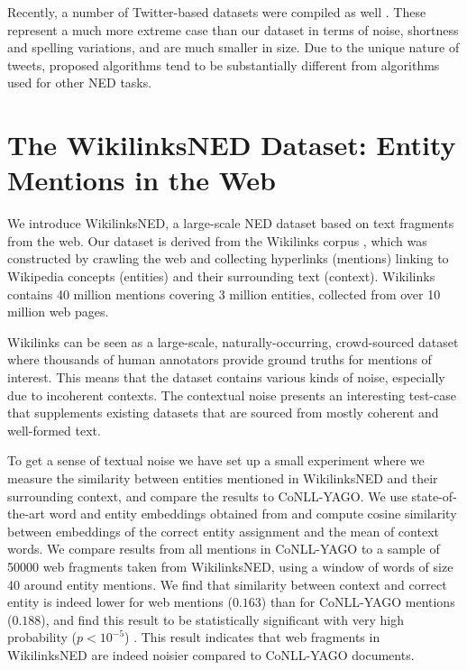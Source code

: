 \documentclass[11pt,a4paper]{article}
\begin{document}
	Recently, a number of Twitter-based datasets were compiled as well \cite{Meij202Adding,fromreide2014crowdsourcing}. These represent a much more extreme case than our dataset in terms of noise, shortness and spelling variations, and are much smaller in size. Due to the unique nature of tweets, proposed algorithms tend to be substantially different from algorithms used for other NED tasks.
	
	\section{The WikilinksNED Dataset: \qquad\qquad Entity Mentions in the Web}
	\label{sec:w}
	
	We introduce WikilinksNED, a large-scale NED dataset based on text fragments from the web. Our dataset is derived from the Wikilinks corpus \cite{singh12:wiki-links}, which was constructed by crawling the web and collecting hyperlinks (mentions) linking to Wikipedia concepts (entities) and their surrounding text (context). Wikilinks contains 40 million mentions covering 3 million entities, collected from over 10 million web pages. 
	
	Wikilinks can be seen as a large-scale, naturally-occurring, crowd-sourced dataset where thousands of human annotators provide ground truths for mentions of interest. This means that the dataset contains various kinds of noise, especially due to incoherent contexts. The contextual noise presents an interesting test-case that supplements existing datasets that are sourced from mostly coherent and well-formed text. 
	
	To get a sense of textual noise we have set up a small experiment where we measure the similarity between entities mentioned in WikilinksNED and their surrounding context, and compare the results to CoNLL-YAGO. We use state-of-the-art word and entity embeddings obtained from  and compute cosine similarity between embeddings of the correct entity assignment and the mean of context words. We compare results from all mentions in CoNLL-YAGO to a sample of 50000 web fragments taken from WikilinksNED, using a window of words of size 40 around entity mentions. We find that similarity between context and correct entity is indeed lower for web mentions ($0.163$) than for CoNLL-YAGO mentions ($0.188$), and find this result to be statistically significant with very high probability ($p<10^{-5}$) . This result indicates that web fragments in WikilinksNED are indeed noisier compared to CoNLL-YAGO documents.
	
\end{document}
